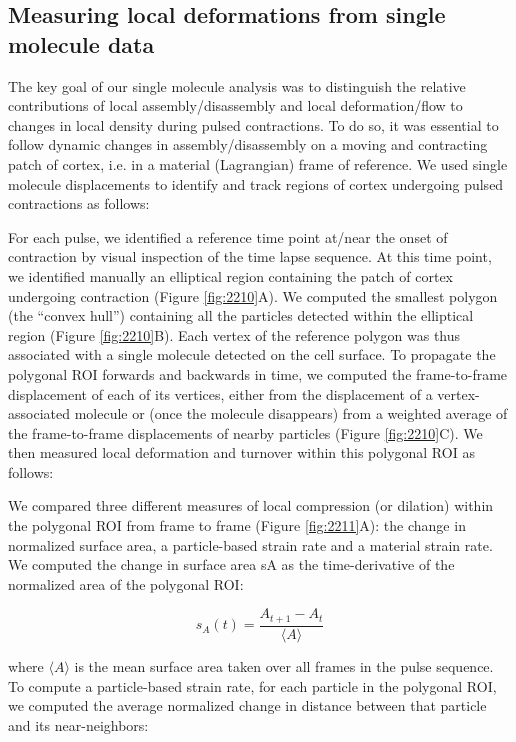 \subsection{Measuring local deformations from single molecule data}
The key goal of our single molecule analysis was to distinguish the relative contributions of local assembly/disassembly and local deformation/flow to changes in local density during pulsed contractions. To do so, it was essential to follow dynamic changes in assembly/disassembly on a moving and contracting patch of cortex, i.e. in a material (Lagrangian) frame of reference. We used single molecule displacements to identify and track regions of cortex undergoing pulsed contractions as follows:


For each pulse, we identified a reference time point at/near the onset of contraction by visual inspection of the time lapse sequence. At this time point, we identified manually an elliptical region containing the patch of cortex undergoing contraction (Figure \ref{fig:2210}A). We computed the smallest polygon (the ``convex hull'') containing all the particles detected within the elliptical region (Figure \ref{fig:2210}B). Each vertex of the reference polygon was thus associated with a single molecule detected on the cell surface. To propagate the polygonal ROI forwards and backwards in time, we computed the frame-to-frame displacement of each of its vertices, either from the displacement of a vertex-associated molecule or (once the molecule disappears) from a weighted average of the frame-to-frame displacements of nearby particles (Figure \ref{fig:2210}C). We then measured local deformation and turnover within this polygonal ROI as follows:






We compared three different measures of local compression (or dilation) within the polygonal ROI from frame to frame (Figure \ref{fig:2211}A):  the change in normalized surface area, a particle-based strain rate and a material strain rate. We computed the change in surface area sA as the time-derivative of the normalized area of the polygonal ROI:

$$s_{A}(t) = \frac{A_{t+1} - A_{t}}{\langle A \rangle}$$

where $\langle A \rangle$ is the mean surface area taken over all frames in the pulse sequence. To compute a particle-based strain rate, for each particle in the polygonal ROI, we computed the average normalized change in distance between that particle and its near-neighbors:



